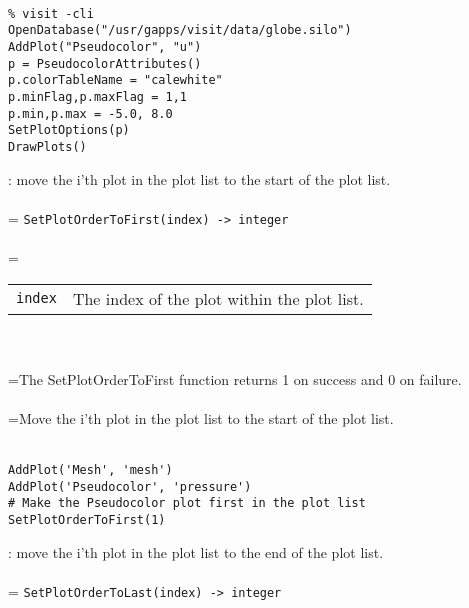 \documentclass[10pt,a4paper]{report}
\begin{document}
\\[-6mm]
\begin{verbatim}% visit -cli
OpenDatabase("/usr/gapps/visit/data/globe.silo")
AddPlot("Pseudocolor", "u")
p = PseudocolorAttributes()
p.colorTableName = "calewhite"
p.minFlag,p.maxFlag = 1,1
p.min,p.max = -5.0, 8.0
SetPlotOptions(p)
DrawPlots()
\end{verbatim}
\newpage


{}
: move the i'th plot in the plot list to the start of the plot list.\\[-3mm]

 \\ 
\hangindent=\parindent 
\verb!SetPlotOrderToFirst(index) -> integer!\\ [-3mm]

 \\ 
\hangindent=\parindent 
\begin{tabular}{lp{9cm}}
\verb!index! & The index of the plot within the plot list. \\
\end{tabular} \\[-2mm]


 \\ 
\hangindent=\parindent The SetPlotOrderToFirst function returns 1 on success and 0 on failure. \\[-3mm] 

 \\ 
\hangindent=\parindent Move the i'th plot in the plot list to the start of the plot list. \\[-3mm] 

\\[-6mm]
\begin{verbatim}AddPlot('Mesh', 'mesh')
AddPlot('Pseudocolor', 'pressure')
# Make the Pseudocolor plot first in the plot list
SetPlotOrderToFirst(1)
\end{verbatim}
\newpage


{}
: move the i'th plot in the plot list to the end of the plot list.\\[-3mm]

 \\ 
\hangindent=\parindent 
\verb!SetPlotOrderToLast(index) -> integer!\\ [-3mm]
\end{document}
